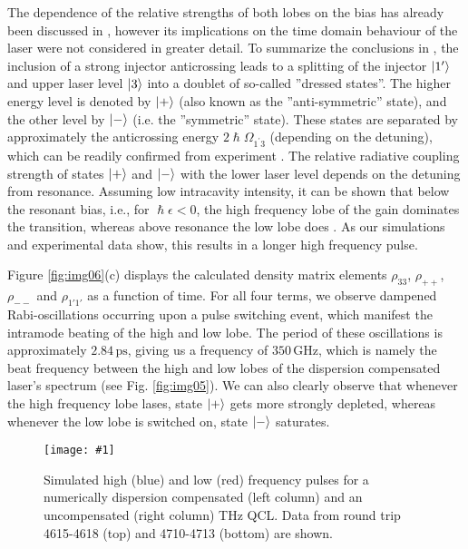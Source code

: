 \documentclass[10pt]{article}
\newcommand{\includegraphicsXL}[1]{\texttt{[image: \#1]}}
\begin{document}
	The dependence of the relative strengths of both lobes on the bias\textrm{
	}has already been discussed in \cite{dupont2010simplified}, however its
	implications on the time domain behaviour of the laser were not considered in
	greater detail. To summarize the conclusions in \cite{dupont2010simplified},
	the inclusion of a strong injector anticrossing leads to a splitting of the
	injector $\Ket{1'}$ and upper laser level $\Ket{3}$ into a doublet of
	so-called ''dressed states''. The higher energy level is denoted by $\Ket{+}$
	(also known as the ''anti-symmetric'' state), and the other level by $\Ket{-}$
	(i.e. the ''symmetric'' state). These states are separated by approximately
	the anticrossing energy $2\hslash\Omega_{1^{\prime}3}$ (depending on the
	detuning), which can be readily confirmed from experiment
	\cite{burghoff2014terahertz}. The relative radiative coupling strength of
	states $\Ket{+}$ and $\Ket{-}$ with the lower laser level depends on the
	detuning from resonance. Assuming low intracavity intensity, it can be shown
	that below the resonant bias, i.e., for $\hslash\epsilon<0$, the high frequency
	lobe of the gain dominates the transition, whereas above resonance the low
	lobe does \cite{dupont2010simplified}. As our simulations and
	experimental data show, this results in a longer high frequency pulse.
		
	Figure \ref{fig:img06}(c) displays the calculated density matrix elements
	$\rho_{33}$, $\rho_{++}$, $\rho_{--}$ and $\rho_{1'1'}$ as a function of time. 
	For all four terms, we observe dampened Rabi-oscillations occurring upon a pulse switching event, which manifest the intramode beating of the high and low lobe. The
	period of these oscillations is approximately $2.84{\,}\mathrm{ps}$, giving us a frequency of $350{\,}\mathrm{GHz}$,
	which is namely the beat frequency between the high and low lobes of the dispersion compensated laser's spectrum
	(see Fig. \ref{fig:img05}). We can also clearly observe that whenever the high
	frequency lobe lases, state $\Ket{+}$ gets more strongly depleted, whereas 
	whenever the low lobe is switched on, state $\Ket{-}$ saturates. 
			
	\begin{figure}[h!]
		\begin{center}
			\includegraphicsXL{TEMPHOLEBURNING.eps}
		\end{center}
		\caption{Simulated high (blue) and low (red) frequency pulses for a
			numerically dispersion compensated (left column) and an uncompensated (right
			column) THz QCL. Data from round trip 4615-4618 (top) and
			4710-4713 (bottom) are shown.}%
		\label{fig:img07}%
	\end{figure}
			
\end{document}
